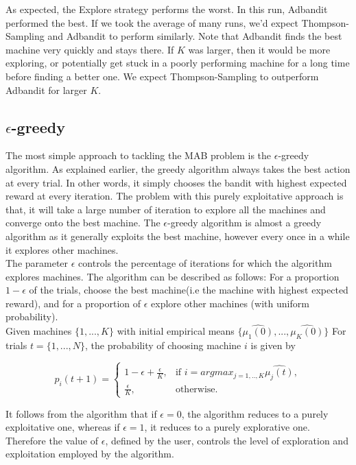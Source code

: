 \documentclass{article}
\begin{document}
As expected, the Explore strategy performs the worst. In this run, Adbandit performed the best. If we took the average of many runs, we'd expect Thompson-Sampling and Adbandit to perform similarly. Note that Adbandit finds the best machine very quickly and stays there. If $K$ was larger, then it would be more exploring, or potentially get stuck in a poorly performing machine for a long time before finding a better one. We expect Thompson-Sampling to outperform Adbandit for larger $K$.

\subsection{$\epsilon$-greedy}

The most simple approach to tackling the MAB problem is the $\epsilon$-greedy algorithm. As explained earlier, the greedy algorithm always takes the best action at every trial. In other words, it simply chooses the bandit with highest expected reward at every iteration. The problem with this purely exploitative approach is that, it will take a large number of iteration to explore all the machines and converge onto the best machine. The $\epsilon$-greedy algorithm is almost a greedy algorithm as it generally exploits the best machine, however every once in a while it explores other machines.\\ 

The parameter $\epsilon$ controls the percentage of iterations for which the algorithm explores machines. The algorithm can be described as follows: For a proportion $1 - \epsilon$ of the trials, choose the best machine(i.e the machine with highest expected reward), and for a proportion of $\epsilon$ explore other machines (with uniform probability).\\

Given machines $\{1,...,K\}$ with initial empirical means $\{\hat{\mu_1(0)},...,\hat{\mu_K(0)}\}$ For trials $t = \{1,...,N\}$, the probability of choosing machine $i$ is given by

$$p_i(t+1) = \begin{cases}
  1- \epsilon + \frac{\epsilon}{K}, & \text{if } i = argmax_{j=1,..,K}\hat{\mu_j(t)}, \\
  \frac{\epsilon}{K}, & \text{otherwise}.
\end{cases}$$


It follows from the algorithm that if $\epsilon = 0$, the algorithm reduces to a purely exploitative one, whereas if $\epsilon = 1$, it reduces to a purely explorative one. Therefore the value of $\epsilon$, defined by the user, controls the level of exploration and exploitation employed by the algorithm.\\
\end{document}
